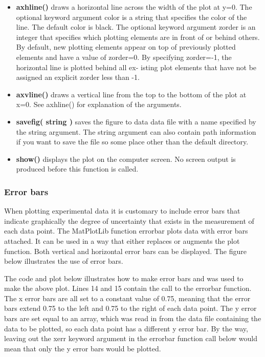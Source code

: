 \documentclass[11pt]{article}
\begin{document}
\begin{itemize}
\item
  \textbf{axhline()} draws a horizontal line across the width of the
  plot at y=0. The optional keyword argument color is a string that
  specifies the color of the line. The default color is black. The
  optional keyword argument zorder is an integer that specifies which
  plotting elements are in front of or behind others. By default, new
  plotting elements appear on top of previously plotted elements and
  have a value of zorder=0. By specifying zorder=-1, the horizontal line
  is plotted behind all ex- isting plot elements that have not be
  assigned an explicit zorder less than -1.
\item
  \textbf{axvline()} draws a vertical line from the top to the bottom of
  the plot at x=0. See axhline() for explanation of the arguments.
\item
  \textbf{savefig( string )} saves the figure to data data file with a
  name specified by the string argument. The string argument can also
  contain path information if you want to save the file so some place
  other than the default directory.
\item
  \textbf{show()} displays the plot on the computer screen. No screen
  output is produced before this function is called.
\end{itemize}

    \hypertarget{error-bars}{%
\subsubsection{Error bars}\label{error-bars}}

When plotting experimental data it is customary to include error bars
that indicate graphically the degree of uncertainty that exists in the
measurement of each data point. The MatPlotLib function errorbar plots
data with error bars attached. It can be used in a way that either
replaces or augments the plot function. Both vertical and horizontal
error bars can be displayed. The figure below illustrates the use of
error bars.

The code and plot below illustrates how to make error bars and was used
to make the above plot. Lines 14 and 15 contain the call to the errorbar
function. The x error bars are all set to a constant value of 0.75,
meaning that the error bars extend 0.75 to the left and 0.75 to the
right of each data point. The y error bars are set equal to an array,
which was read in from the data file containing the data to be plotted,
so each data point has a different y error bar. By the way, leaving out
the xerr keyword argument in the errorbar function call below would mean
that only the y error bars would be plotted.
\end{document}
